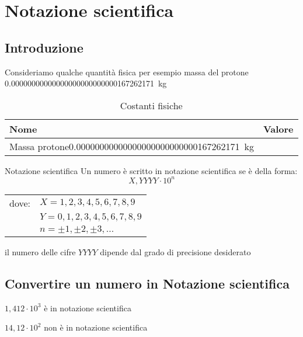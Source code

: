 \chapter{Notazione scientifica}
\section{Introduzione}
Consideriamo qualche quantità fisica per esempio massa del protone \SI{0,00000000000000000000000000167262171}{\kilogram}


\begin{table}
	\centering
	\begin{tabular}{lS}
		\toprule
		Nome&Valore\\
		\midrule
	Massa protone\SI{0,00000000000000000000000000167262171}{\kilogram}\\
		\bottomrule
	\end{tabular}
\caption{Costanti fisiche}
\label{tab:costantifisiche1}
\end{table}
\label{cha:NotazioneScientifica}
\begin{definizionet}{Notazione scientifica}{}
Un numero è scritto in notazione scientifica se è della forma:
\[X,YYYY \cdot 10^n \]
\begin{tabular}{ll}
dove:&    $X=1,2,3,4,5,6,7,8,9$  \\ 
	    &     $ Y=0,1,2,3,4,5,6,7,8,9$ \\ 
	   &  $n=\pm 1, \pm 2,\pm 3,\ldots$\\
\end{tabular}
 
il numero delle cifre $YYYY$ dipende dal grado di precisione desiderato
\end{definizionet}
\section{Convertire un numero in Notazione scientifica}
\begin{esempiot}{}{}
	$1,412\cdot 10^3$ è in notazione scientifica
	
	$14,12\cdot 10^2$ non è in notazione scientifica
\end{esempiot}